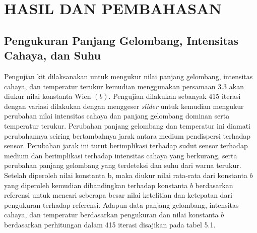\chapter{HASIL DAN PEMBAHASAN}

\section{Pengukuran Panjang Gelombang, Intensitas Cahaya, dan Suhu}
Pengujian kit dilaksanakan untuk mengukur nilai panjang gelombang, intensitas cahaya, dan temperatur terukur kemudian menggunakan persamaan 3.3 akan diukur nilai konstanta Wien $(b)$. Pengujian dilakukan sebanyak 415 iterasi dengan variasi dilakukan dengan menggeser \textit{slider} untuk kemudian mengukur perubahan nilai intensitas cahaya dan panjang gelombang dominan serta temperatur terukur. Perubahan panjang gelombang dan temperatur ini diamati perubahannya seiring bertambahnya jarak antara medium pendispersi terhadap sensor. Perubahan jarak ini turut berimplikasi terhadap sudut sensor terhadap medium dan berimplikasi terhadap intensitas cahaya yang berkurang, serta perubahan panjang gelombang yang terdeteksi dan suhu dari warna terukur. Setelah diperoleh nilai konstanta b, maka diukur nilai rata-rata dari konstanta $b$ yang diperoleh kemudian dibandingkan terhadap konstanta $b$ berdasarkan referensi untuk mencari seberapa besar nilai ketelitian dan ketepatan dari pengukuran terhadap referensi. Adapun data panjang gelombang, intensitas cahaya, dan temperatur berdasarkan pengukuran dan nilai konstanta $b$ berdasarkan perhitungan dalam 415 iterasi disajikan pada tabel 5.1.


\newpage

